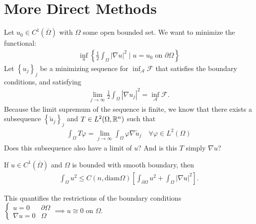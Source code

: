 \documentclass{memoir}
\begin{document}


\section{More Direct Methods}
\label{sec:more_direct_methods}

Let \(u_0 \in C^{1}(\overline{\Omega })\) with \(\Omega \) some open bounded set. We want to minimize the functional:
\begin{align*}
	\inf_{u} \left\{\frac{1}{2} \int_\Omega \left| \nabla u \right|^2 \mid u =u_0 \text{ on }\partial\Omega  \right\} 
\end{align*}
Let \(\left\{ u_j \right\}_j\) be a minimizing sequence for \(\inf_{\mathcal{A}} \mathcal{F}\) that satisfies the boundary conditions, and satisfying
\begin{align*}
	\lim_{j \to \infty} \frac{1}{2}\int_\Omega \left| \nabla u_j \right|^2 = \inf_{\mathcal{A}} \mathcal{F}.
\end{align*}
Because the limit supremum of the sequence is finite, we know that there exists a subsequence \(\left\{ \tilde{u}_j \right\}_j\) and \(T \in L^2(\Omega , \mathbb{R}^{n})\) such that
\begin{align*}
	\int_\Omega T \varphi  = \lim_{j \to \infty} \int_\Omega \varphi \nabla \tilde{u}_j \quad \forall \varphi  \in L^2(\Omega )
\end{align*}
Does this subsequence also have a limit of \(u\)? And is this \(T\) simply \(\nabla u\)?  

\begin{thm}
	If \(u \in C^{1}(\overline{\Omega })\) and \(\Omega \) is bounded with smooth boundary, then
	\begin{align*}
		\int_\Omega u^2 \leq C(n, \textrm{diam}\Omega ) \left[ \int_{\partial \Omega }u^2 + \int_\Omega \left| \nabla  u\right|^2 \right] .
	\end{align*}
\end{thm}
This quantifies the restrictions of the boundary conditions \(\begin{cases}
	u=0 & \partial\Omega \\
	\nabla u=0 & \Omega 
\end{cases} \implies u \cong 0\) on \(\Omega \).
\end{document}
